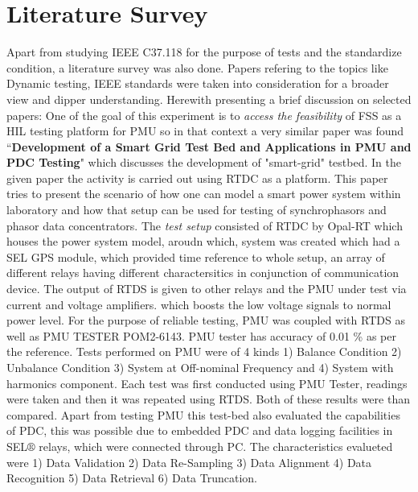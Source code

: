 \section{Literature Survey}

Apart from studying IEEE C37.118 for the purpose of tests and the standardize condition, a literature survey was also done. Papers refering to the topics like Dynamic testing, IEEE standards were taken into consideration for a broader view and dipper understanding. Herewith presenting a brief discussion on selected papers:
One of the goal of this experiment is to \textit{access the feasibility} of FSS as a HIL testing platform for PMU so in that context a very similar paper was found ``\textbf{Development of a Smart Grid Test Bed and Applications in PMU and PDC Testing}"  which discusses the development of "smart-grid" testbed. In the given paper the activity is carried out using RTDC as a platform. This paper tries to present the scenario of how one can model a smart power system within laboratory and how that setup can be used for testing of synchrophasors and phasor data concentrators. The \textit{test setup} consisted of RTDC by Opal-RT which houses the power system model, aroudn which, system was created which had a SEL GPS module, which provided time reference to whole setup, an array of different relays having different charactersitics in conjunction of communication device. The output of RTDS is given to other relays and the PMU under test via current and voltage amplifiers. which boosts the low voltage signals to normal power level. For the purpose of reliable testing, PMU was coupled with RTDS as well as PMU TESTER POM2-6143\cite{Paper:saugata}. PMU tester has accuracy of 0.01 \% as per the reference. Tests performed on PMU were of 4 kinds 1) Balance Condition 2) Unbalance Condition 3) System at Off-nominal Frequency and 4) System with harmonics component. Each test was first conducted using PMU Tester, readings were taken and then it was repeated using RTDS. Both of these results were than compared. Apart from testing PMU this test-bed also evaluated the capabilities of PDC, this was possible due to embedded PDC and data logging facilities in SEL$\circledR$ relays, which were connected through PC. The characteristics evalueted were 1) Data Validation 2) Data Re-Sampling 3) Data Alignment 4) Data Recognition 5) Data Retrieval 6) Data Truncation.

